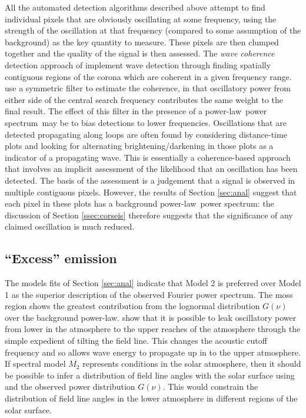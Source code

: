 \documentclass[onecolumn]{emulateapj}
\newcommand{\PS}{power spectrum}
\newcommand{\PL}{power-law}
\newcommand{\BF}{ }
\begin{document}
All the automated detection algorithms described above attempt to find
individual pixels that are obviously oscillating at some frequency,
using the strength of the oscillation at that frequency (compared to
some assumption of the background) as the key quantity to measure.
These pixels are then clumped together and the quality of the signal
is then assessed.  The {\it wave coherence} detection approach of
\cite{2008SoPh..252..321M} implement wave detection through finding
spatially contiguous regions of the corona which are coherent in a
given frequency range.  {\BF \cite{2008SoPh..252..321M} use a
  symmetric filter to estimate the coherence, in that oscillatory
  power from either side of the central search frequency contributes
  the same weight to the final result.  The effect of this filter in
  the presence of a \PL\ \PS\ may be to bias detections to lower
  frequencies.}  Oscillations that are detected propagating along
loops are often found by considering distance-time plots
\citep{2000AA...355L..23D, 2003AA...404L...1K} and looking for
alternating brightening/darkening in those plots as a indicator of a
propagating wave.  This is essentially a coherence-based approach that
involves an implicit assessment of the likelihood that an oscillation
has been detected.  The basis of the assessment is a judgement that a
signal is observed in multiple contiguous pixels.  However, the results of
Section \ref{sec:anal} suggest that each pixel in these plots has a
background \PL\ \PS: the discussion of Section \ref{ssec:corseis}
therefore suggests that the significance of any claimed oscillation is
much reduced.

\subsection{``Excess'' emission}\label{ssec:excess}
The models fits of Section \ref{sec:anal} indicate that Model 2 is
preferred over Model 1 as the superior description of the observed
Fourier \PS. The moss region shows the greatest contribution from the
lognormal distribution $G(\nu)$ over the background \PL.
\cite{2005ApJ...624L..61D} show that it is possible to leak
oscillatory power from lower in the atmosphere to the upper reaches of
the atmosphere through the simple expedient of tilting the field line.
This changes the acoustic cutoff frequency and so allows wave energy
to propagate up in to the upper atmosphere.  If spectral model $M_{2}$
represents conditions in the solar atmosphere, then it should be
possible to infer a distribution of field line angles with the solar
surface using \cite{2005ApJ...624L..61D} and the observed power
distribution $G(\nu)$.  This would constrain the distribution of field
line angles in the lower atmosphere in different regions of the solar
surface.
\end{document}
